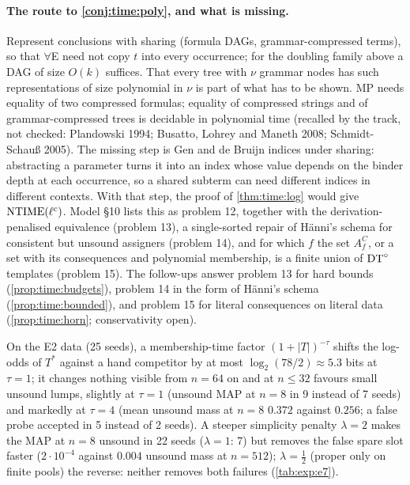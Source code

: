 \paragraph{The route to \cref{conj:time:poly}, and what is missing.} Represent conclusions with sharing (formula DAGs, grammar-compressed terms), so that $\forall$E need not copy $t$ into every occurrence; for the doubling family above a DAG of size $O(k)$ suffices. That every tree with $\nu$ grammar nodes has such representations of size polynomial in $\nu$ is part of what has to be shown. MP needs equality of two compressed formulas; equality of compressed strings and of grammar-compressed trees is decidable in polynomial time (recalled by the track, not checked: Plandowski 1994; Busatto, Lohrey and Maneth 2008; Schmidt-Schau{\ss} 2005). The missing step is Gen and de Bruijn indices under sharing: abstracting a parameter turns it into an index whose value depends on the binder depth at each occurrence, so a shared subterm can need different indices in different contexts. With that step, the proof of \cref{thm:time:log} would give $\mathrm{NTIME}(\ell^c)$. Model \S10 lists this as problem 12, together with the derivation-penalised equivalence (problem 13), a single-sorted repair of H\"anni's schema for consistent but unsound assigners (problem 14), and for which $f$ the set $A^C_f$, or a set with its consequences and polynomial membership, is a finite union of $\mathrm{DT}^{\circ}$ templates (problem 15). The follow-ups answer problem 13 for hard bounds (\cref{prop:time:budgets}), problem 14 in the form of H\"anni's schema (\cref{prop:time:bounded}), and problem 15 for literal consequences on literal data (\cref{prop:time:horn}; conservativity open).

\begin{remark}\label{rem:time:e7}
On the E2 data (25 seeds), a membership-time factor $(1+|T|)^{-\tau}$ shifts the log-odds of $T^*$ against a hand competitor by at most $\log_2(78/2)\approx5.3$ bits at $\tau=1$; it changes nothing visible from $n=64$ on and at $n\le32$ favours small unsound lumps, slightly at $\tau=1$ (unsound MAP at $n=8$ in 9 instead of 7 seeds) and markedly at $\tau=4$ (mean unsound mass at $n=8$ $0.372$ against $0.256$; a false probe accepted in 5 instead of 2 seeds). A steeper simplicity penalty $\lambda=2$ makes the MAP at $n=8$ unsound in 22 seeds ($\lambda=1$: 7) but removes the false spare slot faster ($2\cdot10^{-4}$ against $0.004$ unsound mass at $n=512$); $\lambda=\tfrac12$ (proper only on finite pools) the reverse: neither removes both failures (\cref{tab:exp:e7}).
\end{remark}

